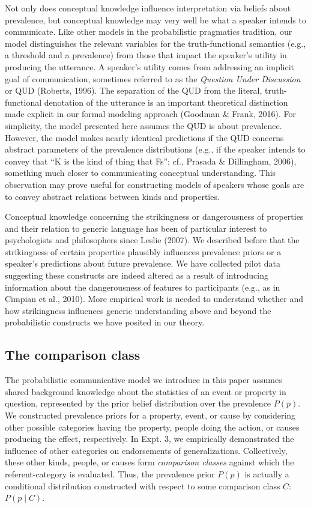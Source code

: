 \documentclass[english,,man,floatsintext]{apa6}
\theoremstyle{definition}
\theoremstyle{definition}
\theoremstyle{definition}
\theoremstyle{remark}
\begin{document}
Not only does conceptual knowledge influence interpretation via beliefs
about prevalence, but conceptual knowledge may very well be what a
speaker intends to communicate. Like other models in the probabilistic
pragmatics tradition, our model distinguishes the relevant variables for
the truth-functional semantics (e.g., a threshold and a prevalence) from
those that impact the speaker's utility in producing the utterance. A
speaker's utility comes from addressing an implicit goal of
communication, sometimes referred to as the \emph{Question Under
Discussion} or QUD (Roberts, 1996). The separation of the QUD from the
literal, truth-functional denotation of the utterance is an important
theoretical distinction made explicit in our formal modeling approach
(Goodman \& Frank, 2016). For simplicity, the model presented here
assumes the QUD is about prevalence. However, the model makes nearly
identical predictions if the QUD concerns abstract parameters of the
prevalence distributions (e.g., if the speaker intends to convey that
``K is the kind of thing that Fs''; cf., Prasada \& Dillingham, 2006),
something much closer to communicating conceptual understanding. This
observation may prove useful for constructing models of speakers whose
goals are to convey abstract relations between kinds and properties.

Conceptual knowledge concerning the strikingness or dangerousness of
properties and their relation to generic language has been of particular
interest to psychologists and philosophers since Leslie (2007). We
described before that the strikingness of certain properties plausibly
influences prevalence priors or a speaker's predictions about future
prevalence. We have collected pilot data suggesting these constructs are
indeed altered as a result of introducing information about the
dangerousness of features to participants (e.g., as in Cimpian et al.,
2010). More empirical work is needed to understand whether and how
strikingness influences generic understanding above and beyond the
probabilistic constructs we have posited in our theory.

\hypertarget{the-comparison-class}{%
\subsection{The comparison class}\label{the-comparison-class}}

The probabilistic communicative model we introduce in this paper assumes
shared background knowledge about the statistics of an event or property
in question, represented by the prior belief distribution over the
prevalence \(P(p)\). We constructed prevalence priors for a property,
event, or cause by considering other possible categories having the
property, people doing the action, or causes producing the effect,
respectively. In Expt. 3, we empirically demonstrated the influence of
other categories on endorsements of generalizations. Collectively, these
other kinds, people, or causes form \emph{comparison classes} against
which the referent-category is evaluated. Thus, the prevalence prior
\(P(p)\) is actually a conditional distribution constructed with respect
to some comparison class \(C\): \(P(p \mid C)\).
\end{document}

